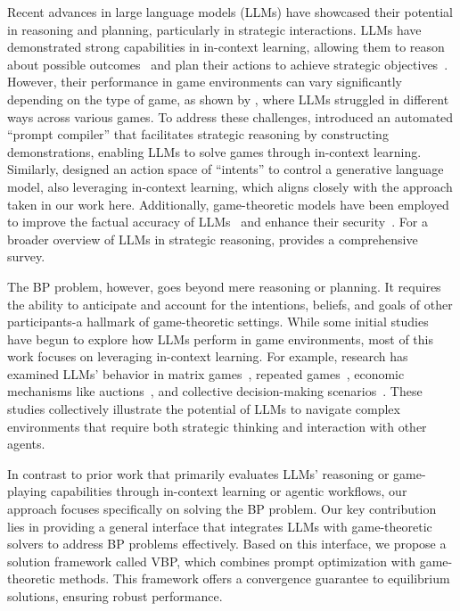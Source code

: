 Recent advances in large language models (LLMs) have showcased their potential in reasoning and planning, particularly in strategic interactions. 
LLMs have demonstrated strong capabilities in in-context learning, allowing them to reason about possible outcomes~\citep{kojima2022large} and plan their actions to achieve strategic objectives~\citep{liu2023llm+}. 
However, their performance in game environments can vary significantly depending on the type of game, as shown by \citet{lore2023strategic}, where LLMs struggled in different ways across various games. 
To address these challenges, \citet{gandhi2023strategic} introduced an automated ``prompt compiler'' that facilitates strategic reasoning by constructing demonstrations, enabling LLMs to solve games through in-context learning. 
Similarly, \citet{meta2022human} designed an action space of ``intents'' to control a generative language model, also leveraging in-context learning, which aligns closely with the approach taken in our work here. 
Additionally, game-theoretic models have been employed to improve the factual accuracy of LLMs~\citep{jacob2024the} and enhance their security~\citep{ma2023red}. 
For a broader overview of LLMs in strategic reasoning, \citet{zhang2024llm} provides a comprehensive survey.

The BP problem, however, goes beyond mere reasoning or planning. 
It requires the ability to anticipate and account for the intentions, beliefs, and goals of other participants-a hallmark of game-theoretic settings. 
While some initial studies have begun to explore how LLMs perform in game environments, most of this work focuses on leveraging in-context learning. 
For example, research has examined LLMs' behavior in matrix games~\citep{xu2023magic,fan2024can}, repeated games~\citep{akata2023playing,zhang2024k,huang2024far,silva2024large}, economic mechanisms like auctions~\citep{chen2023put,mao2023alympics}, and collective decision-making scenarios~\citep{jarrett2023language}. 
These studies collectively illustrate the potential of LLMs to navigate complex environments that require both strategic thinking and interaction with other agents.

In contrast to prior work that primarily evaluates LLMs' reasoning or game-playing capabilities through in-context learning or agentic workflows, our approach focuses specifically on solving the BP problem. 
Our key contribution lies in providing a general interface that integrates LLMs with game-theoretic solvers to address BP problems effectively. 
Based on this interface, we propose a solution framework called VBP, which combines prompt optimization with game-theoretic methods. 
This framework offers a convergence guarantee to equilibrium solutions, ensuring robust performance.

